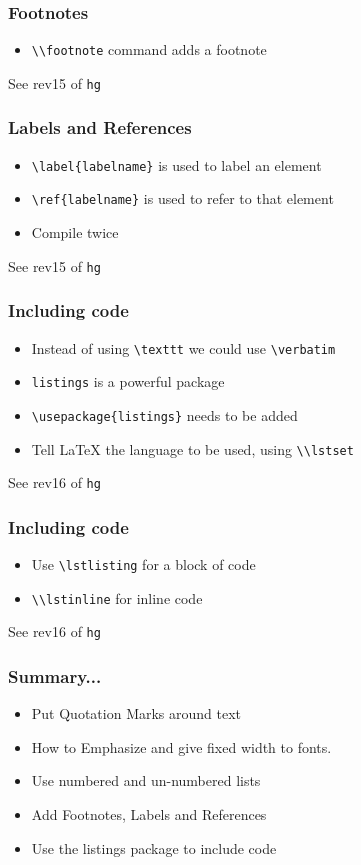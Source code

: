 \documentclass[14pt,compress]{beamer}
\newcommand{\typ}[1]{\lstinline{#1}}
\begin{document}
\begin{frame}[fragile]
  \frametitle{Footnotes}
  \begin{itemize}
  \item \typ{\\footnote} command adds a footnote
  \end{itemize}
  \tiny See rev15 of \typ{hg}
\end{frame}

\begin{frame}[fragile]
  \frametitle{Labels and References}
  \begin{itemize}
  \item \lstinline+\label{labelname}+ is used to label an element
  \item \lstinline+\ref{labelname}+ is used to refer to that element
  \item Compile twice
  \end{itemize}
  \tiny See rev15 of \typ{hg}
\end{frame}

\begin{frame}[fragile]
  \frametitle{Including code}
  \begin{itemize}
  \item Instead of using \lstinline{\texttt} we could use
    \lstinline{\verbatim} 
  \item \lstinline+listings+ is a powerful package
  \item \lstinline+\usepackage{listings}+ needs to be added 
  \item Tell {\LaTeX} the language to be used, using \typ{\\lstset}
  \end{itemize}
  \tiny See rev16 of \typ{hg}
\end{frame}

\begin{frame}[fragile]
  \frametitle{Including code}
  \begin{itemize}
  \item Use \lstinline+\lstlisting+ for a block of code
  \item \typ{\\lstinline} for inline code
  \end{itemize}
  \tiny See rev16 of \typ{hg}
\end{frame}


\begin{frame}[fragile]
	\frametitle{Summary...}
	\begin{itemize}
	\item Put Quotation Marks around text
	\item How to Emphasize and give fixed width to fonts.
	\item Use numbered and un-numbered lists
	\item Add Footnotes, Labels and References
	\item Use the listings package to include code
	\end{itemize}
\end{frame}
\end{document}
